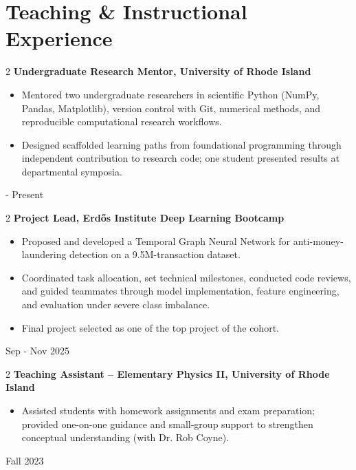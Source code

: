 \documentclass[10pt, letterpaper]{article}
\newenvironment{highlights}{
    \begin{itemize}[
        topsep=0.10 cm,
        parsep=0.10 cm,
        partopsep=0pt,
        itemsep=0pt,
        leftmargin=0.4 cm + 10pt
    ]
}{
    \end{itemize}
}
\newenvironment{twocolentry}[2][]{
    \onecolentry
    \def\secondColumn{#2}
    \setcolumnwidth{\fill, 3.5 cm}
    \begin{paracol}{2}
}{
    \switchcolumn \raggedleft \secondColumn
    \end{paracol}
    \endonecolentry
}
\begin{document}
\vspace{0.2 cm}
 
 
\section{Teaching \& Instructional Experience}
 
\begin{twocolentry}{2023 - Present}{\textbf{Undergraduate Research Mentor, University of Rhode Island}}
  \begin{highlights}
    \item Mentored two undergraduate researchers in scientific Python (NumPy, Pandas, Matplotlib), 
    version control with Git, numerical methods, and reproducible computational research workflows.
    \item Designed scaffolded learning paths from foundational programming through independent 
    contribution to research code; one student presented results at departmental symposia.
  \end{highlights}
\end{twocolentry}
 
\vspace{0.2 cm}
 
\begin{twocolentry}{Sep - Nov 2025}{\textbf{Project Lead, Erd\H{o}s Institute Deep Learning Bootcamp}}
  \begin{highlights}
    \item Proposed and developed a Temporal Graph Neural Network for anti-money-laundering detection on a 9.5M-transaction dataset.
    \item Coordinated task allocation, set technical milestones, conducted code reviews, and guided teammates through model implementation, 
    feature engineering, and evaluation under severe class imbalance.
    \item Final project selected as one of the top project of the cohort.
  \end{highlights}
\end{twocolentry}
 
\vspace{0.2 cm}

\begin{twocolentry}{Fall 2023}{\textbf{Teaching Assistant -- Elementary Physics II, University of Rhode Island}}
  \begin{highlights}
    \item Assisted students with homework assignments and exam preparation; provided one-on-one guidance and small-group 
    support to strengthen conceptual understanding (with Dr. Rob Coyne).
  \end{highlights}
\end{twocolentry}
\end{document}
